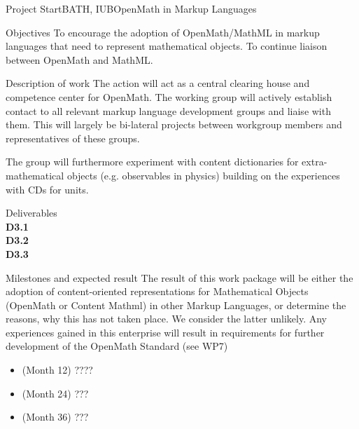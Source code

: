 \documentclass{euproposal}
\def\omcoa{{\sc{OMCoA}}}
\begin{document}
\begin{workpackage}{36}{3}{Project Start}{BATH, IUB}{OpenMath in Markup Languages}
\begin{wpbox}{Objectives}
  To encourage the adoption of OpenMath/MathML in markup languages that need to
  represent mathematical objects.  To continue liaison between OpenMath and
  MathML. 
\end{wpbox}
\begin{wpbox}{Description of work}
  The {\omcoa} action will act as a central clearing house and competence center
  for OpenMath. The working group will actively establish contact to all relevant
  markup language development groups and liaise with them. This will largely be
  bi-lateral projects between workgroup members and representatives of these
  groups. 
  
  The group will furthermore experiment with content dictionaries for
  extra-mathematical objects (e.g.  observables in physics) building on the
  experiences with CDs for units.
\end{wpbox}
\begin{wpbox}{Deliverables\\}
{\bf D3.1} \\
{\bf D3.2} \\
{\bf D3.3} \\
\end{wpbox}
\begin{wpbox}{Milestones and expected result}
  The result of this work package will be either the adoption of content-oriented
  representations for Mathematical Objects (OpenMath or Content Mathml) in other
  Markup Languages, or determine the reasons, why this has not taken place. We
  consider the latter unlikely. Any experiences gained in this enterprise will
  result in requirements for further development of the OpenMath Standard (see WP7)
\begin{itemize}
\item (Month 12) ????
\item (Month 24) ???
\item (Month 36) ???
\end{itemize}
\end{wpbox}
\end{workpackage}
\newpage
\end{document}
